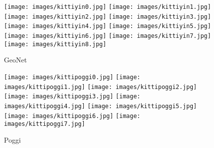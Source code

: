 \documentclass[5p]{elsarticle}
\begin{document}
\begin{figure*}[t!]
\begin{subfigure}[t]{0.16\textwidth}
         \label{kittisubfig0:gt}
     \end{subfigure}
         \begin{subfigure}[t]{0.16\textwidth}
         \centering
         \caption{GeoNet \cite{yin2018geonet}}
         \texttt{[image: images/kittiyin0.jpg]}
         \hspace{1em}
         \texttt{[image: images/kittiyin1.jpg]}
         \hspace{1em}
         \texttt{[image: images/kittiyin2.jpg]}
         \hspace{1em}
         \texttt{[image: images/kittiyin3.jpg]}
         \hspace{1em}
         \texttt{[image: images/kittiyin4.jpg]}
         \hspace{1em}
         \texttt{[image: images/kittiyin5.jpg]}
         \hspace{1em}
         \texttt{[image: images/kittiyin6.jpg]}
         \hspace{1em}
         \texttt{[image: images/kittiyin7.jpg]}
         \hspace{1em}
         \texttt{[image: images/kittiyin8.jpg]}
         \label{kittisubfig0:geonet}
     \end{subfigure}
     \begin{subfigure}[t]{0.16\textwidth}
         \centering
         \caption{Poggi \etal \cite{poggi2018towards}}
         \texttt{[image: images/kittipoggi0.jpg]}
         \hspace{1em}
         \texttt{[image: images/kittipoggi1.jpg]}
         \hspace{1em}
         \texttt{[image: images/kittipoggi2.jpg]}
         \hspace{1em}
         \texttt{[image: images/kittipoggi3.jpg]}
         \hspace{1em}
         \texttt{[image: images/kittipoggi4.jpg]}
         \hspace{1em}
         \texttt{[image: images/kittipoggi5.jpg]}
         \hspace{1em}
         \texttt{[image: images/kittipoggi6.jpg]}
         \hspace{1em}
         \texttt{[image: images/kittipoggi7.jpg]}
         \hspace{1em}

\end{subfigure}
\end{figure*}
\end{document}
